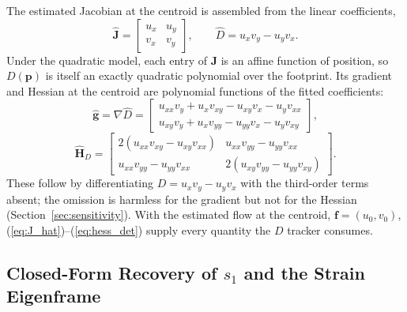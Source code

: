 \documentclass[lettersize,journal]{IEEEtran}
\begin{document}
The estimated Jacobian at the centroid is assembled from the linear
coefficients,
\begin{equation}
    \hat{\mathbf{J}} =
    \begin{bmatrix} u_x & u_y \\ v_x & v_y \end{bmatrix},
    \qquad
    \hat{D} = u_x v_y - u_y v_x.
    \label{eq:J_hat}
\end{equation}
Under the quadratic model, each entry of $\mathbf{J}$ is an affine
function of position, so $D(\mathbf{p})$ is itself an exactly quadratic
polynomial over the footprint. Its gradient and Hessian at the centroid
are polynomial functions of the fitted coefficients:
\begin{equation}
    \hat{\mathbf{g}} = \nabla \hat{D} =
    \begin{bmatrix}
        u_{xx} v_y + u_x v_{xy} - u_{xy} v_x - u_y v_{xx} \\
        u_{xy} v_y + u_x v_{yy} - u_{yy} v_x - u_y v_{xy}
    \end{bmatrix},
    \label{eq:grad_det}
\end{equation}
\begin{equation}
    \hat{\mathbf{H}}_D =
    \begin{bmatrix}
        2(u_{xx} v_{xy} - u_{xy} v_{xx}) &
        u_{xx} v_{yy} - u_{yy} v_{xx} \\
        u_{xx} v_{yy} - u_{yy} v_{xx} &
        2(u_{xy} v_{yy} - u_{yy} v_{xy})
    \end{bmatrix}.
    \label{eq:hess_det}
\end{equation}
These follow by differentiating $D = u_x v_y - u_y v_x$ with the
third-order terms absent; the omission is harmless for the gradient but
not for the Hessian (Section~\ref{sec:sensitivity}). With the estimated
flow at the centroid, $\mathbf{f} = (u_0, v_0)$,
(\ref{eq:J_hat})--(\ref{eq:hess_det}) supply every quantity the $D$
tracker consumes.

\subsection{Closed-Form Recovery of $s_1$ and the Strain Eigenframe}
\label{sec:s1_estimation}
\end{document}
